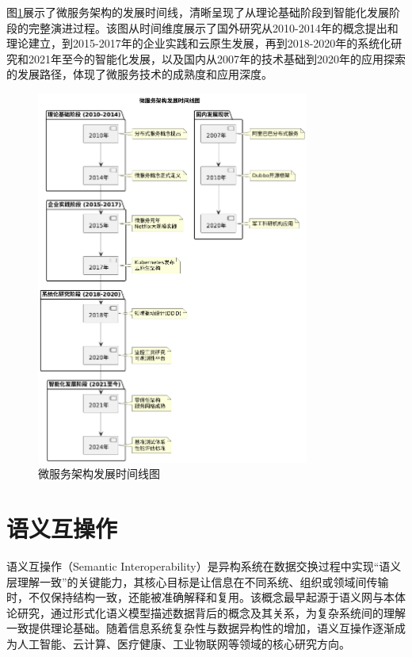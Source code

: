 图\ref{fig_microservices_evolution_timeline}展示了微服务架构的发展时间线，清晰呈现了从理论基础阶段到智能化发展阶段的完整演进过程。该图从时间维度展示了国外研究从2010-2014年的概念提出和理论建立，到2015-2017年的企业实践和云原生发展，再到2018-2020年的系统化研究和2021年至今的智能化发展，以及国内从2007年的技术基础到2020年的应用探索的发展路径，体现了微服务技术的成熟度和应用深度。

\begin{figure}[H]
    \centering
    \includegraphics[width=0.8\textwidth,height=0.6\textheight,keepaspectratio]{chapters/fig-0/microservices_evolution_timeline.png}
    \caption{微服务架构发展时间线图}
    \label{fig_microservices_evolution_timeline}
\end{figure}


\section{语义互操作}

语义互操作（Semantic Interoperability）是异构系统在数据交换过程中实现“语义层理解一致”的关键能力，其核心目标是让信息在不同系统、组织或领域间传输时，不仅保持结构一致，还能被准确解释和复用。该概念最早起源于语义网与本体论研究，通过形式化语义模型描述数据背后的概念及其关系，为复杂系统间的理解一致提供理论基础。随着信息系统复杂性与数据异构性的增加，语义互操作逐渐成为人工智能、云计算、医疗健康、工业物联网等领域的核心研究方向。

